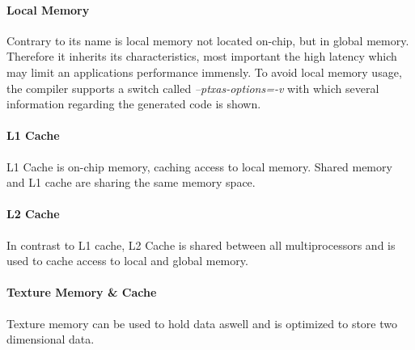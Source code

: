 \paragraph{Local Memory}
Contrary to its name is local memory not located on-chip, but in global memory.
Therefore it inherits its characteristics, most important the high latency which may limit an applications performance immensly.
To avoid local memory usage, the compiler supports a switch called \emph{--ptxas-options=-v} with which several information regarding
the generated code is shown. 
\paragraph{L1 Cache}
L1 Cache is on-chip memory, caching access to local memory. Shared memory and L1 cache are sharing the same memory space. \\
\paragraph{L2 Cache}
In contrast to L1 cache, L2 Cache is shared between all multiprocessors and is used to cache access to local and global memory.\\
\paragraph{Texture Memory \& Cache}
Texture memory can be used to hold data aswell and is optimized to store two dimensional data.\\
